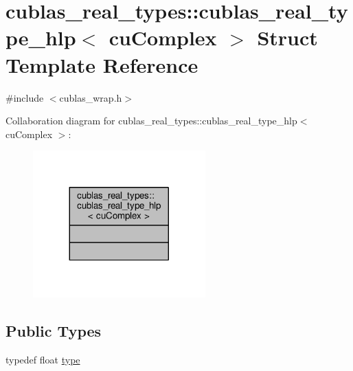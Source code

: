 \hypertarget{structcublas__real__types_1_1cublas__real__type__hlp_3_01cuComplex_01_4}{\section{cublas\-\_\-real\-\_\-types\-:\-:cublas\-\_\-real\-\_\-type\-\_\-hlp$<$ cu\-Complex $>$ Struct Template Reference}
\label{structcublas__real__types_1_1cublas__real__type__hlp_3_01cuComplex_01_4}
}


{\ttfamily \#include $<$cublas\-\_\-wrap.\-h$>$}



Collaboration diagram for cublas\-\_\-real\-\_\-types\-:\-:cublas\-\_\-real\-\_\-type\-\_\-hlp$<$ cu\-Complex $>$\-:
\nopagebreak
\begin{figure}[H]
\begin{center}
\leavevmode
\includegraphics[width=188pt]{structcublas__real__types_1_1cublas__real__type__hlp_3_01cuComplex_01_4__coll__graph}
\end{center}
\end{figure}
\subsection*{Public Types}
\begin{DoxyCompactItemize}
\item 
typedef float \hyperlink{structcublas__real__types_1_1cublas__real__type__hlp_3_01cuComplex_01_4_a0d3a1211ab64a0a4782bbb8f34e9a727}{type}
\end{DoxyCompactItemize}


